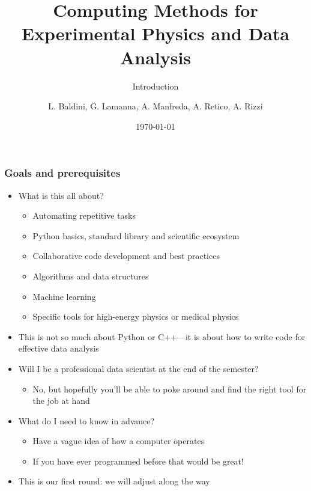 \documentclass[9pt]{beamer}
\title{\scriptsize Computing Methods for Experimental Physics and Data Analysis}
\subtitle{Introduction}
\date{\today}
\author{L. Baldini, G. Lamanna, A. Manfreda, A. Retico, A. Rizzi}
\institute[UNIPI and INFN]{Universit\`a and INFN--Pisa}
\begin{document}
\titleframe

\begin{frame}
  \frametitle{Goals and prerequisites}
  \begin{itemize}
  \item What is this all about?
    \begin{itemize}
    \item Automating repetitive tasks
    \item Python basics, standard library and scientific ecosystem
    \item Collaborative code development and best practices
    \item Algorithms and data structures
    \item Machine learning
    \item Specific tools for high-energy physics or medical physics
    \end{itemize}
  \item \alert{This is not so much about Python or C++---it is about how to
    write code for effective data analysis}
  \item Will I be a professional data scientist at the end of the semester?
    \begin{itemize}
    \item No, but hopefully you'll be able to poke around and find the right
      tool for the job at hand
    \end{itemize}
  \item What do I need to know in advance?
    \begin{itemize}
    \item Have a vague idea of how a computer operates
    \item If you have ever programmed before that would be
      great!
    \end{itemize}
  \item \alert{This is our first round: we will adjust along the way}
  \end{itemize}
\end{frame}
\end{document}
